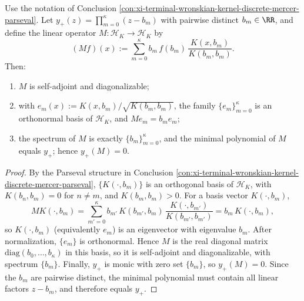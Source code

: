 ﻿%

\begin{conclusion}\label{con:xi-terminal-wronskian-compressed-multiplication-spectrum-minpoly}
Use the notation of Conclusion \ref{con:xi-terminal-wronskian-kernel-discrete-mercer-parseval}.
Let \(y_{+}(z)=\prod_{m=0}^{\kappa}(z-b_m)\) with pairwise distinct \(b_m\in\RR\), and define the linear operator \(M:\mathcal{H}_K\to\mathcal{H}_K\) by
\[
(Mf)(x):=\sum_{m=0}^{\kappa} b_m\,f(b_m)\,\frac{K(x,b_m)}{K(b_m,b_m)}.
\]
Then:
\begin{enumerate}
  \item \(M\) is self-adjoint and diagonalizable;
  \item with \(e_m(x):=K(x,b_m)/\sqrt{K(b_m,b_m)}\), the family \(\{e_m\}_{m=0}^{\kappa}\) is an orthonormal basis of \(\mathcal{H}_K\), and \(Me_m=b_m e_m\);
  \item the spectrum of \(M\) is exactly \(\{b_m\}_{m=0}^{\kappa}\), and the minimal polynomial of \(M\) equals \(y_{+}\); hence \(y_{+}(M)=0\).
\end{enumerate}
\end{conclusion}
\begin{proof}[Proof]
By the Parseval structure in Conclusion \ref{con:xi-terminal-wronskian-kernel-discrete-mercer-parseval}, \(\{K(\cdot,b_m)\}\) is an orthogonal basis of \(\mathcal{H}_K\), with
\(K(b_n,b_m)=0\) for \(n\neq m\), and \(K(b_m,b_m)>0\).
For a basis vector \(K(\cdot,b_m)\),
\[
M K(\cdot,b_m)
=\sum_{m'=0}^{\kappa} b_{m'}\,K(b_{m'},b_m)\,\frac{K(\cdot,b_{m'})}{K(b_{m'},b_{m'})}
=b_m\,K(\cdot,b_m),
\]
so \(K(\cdot,b_m)\) (equivalently \(e_m\)) is an eigenvector with eigenvalue \(b_m\). After normalization, \(\{e_m\}\) is orthonormal.
Hence \(M\) is the real diagonal matrix \(\mathrm{diag}(b_0,\dots,b_\kappa)\) in this basis, so it is self-adjoint and diagonalizable, with spectrum \(\{b_m\}\).
Finally, \(y_{+}\) is monic with zero set \(\{b_m\}\), so \(y_{+}(M)=0\). Since the \(b_m\) are pairwise distinct, the minimal polynomial must contain all linear factors \(z-b_m\), and therefore equals \(y_{+}\).
\end{proof}

